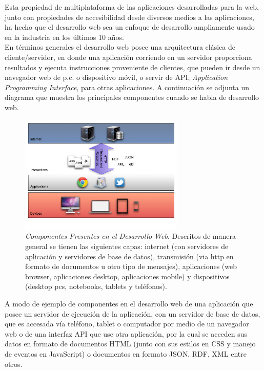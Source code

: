 Esta propiedad de multiplataforma de las aplicaciones desarrolladas para la web, junto con propiedades de accesibilidad desde diversos medios a las aplicaciones, ha hecho que el desarrollo web sea un enfoque de desarrollo ampliamente usado en la industria en los últimos 10 años.\\

En términos generales el desarrollo web posee una arquitectura clásica de cliente/servidor, en donde una aplicación corriendo en un servidor proporciona resultados y ejecuta instrucciones proveniente de clientes, que pueden ir desde un navegador web de p.c. o dispositivo móvil, o servir de API, \emph{Application Programming Interface}, para otras aplicaciones. A continuación se adjunta un diagrama que muestra los principales componentes cuando se habla de desarrollo web.\\

\begin{figure}[H]
  \centering
  \includegraphics[width=0.7\textwidth]{images/web_development.png}
  \caption[Componentes Presentes en el Desarrollo Web]{\emph{Componentes Presentes en el Desarrollo Web}. Descritos de manera general se tienen las siguientes capas: internet (con servidores de aplicación y servidores de base de datos), transmisión (via http en formato de documentos u otro tipo de mensajes), aplicaciones (web browser, aplicaciones desktop, aplicaciones mobile) y dispositivos (desktop pcs, notebooks, tablets y teléfonos).}
  \label{web_development}
\end{figure}

A modo de ejemplo de componentes en el desarrollo web de una aplicación que posee un servidor de ejecución de la aplicación, con un servidor de base de datos, que es accesada vía teléfono, tablet o computador por medio de un navegador web o de una interfaz API que use otra aplicación, por la cual se acceden sus datos en formato de documentos HTML (junto con sus estilos en CSS y manejo de eventos en JavaScript) o documentos en formato JSON, RDF, XML entre otros.\\

